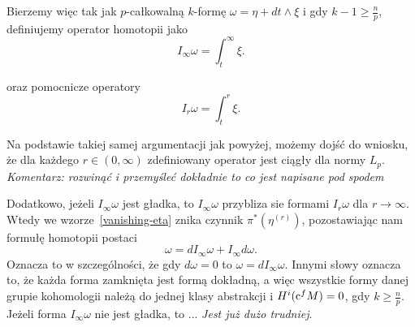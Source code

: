\documentclass[licencjacka]{pracamgr}
\theoremstyle{definition}
\theoremstyle{definition}
\theoremstyle{plain}
\theoremstyle{plain}
\theoremstyle{plain}
\theoremstyle{plain}
\def\cfm{\ensuremath\mathrm{c}^fM}
\begin{document}
Bierzemy więc tak jak $p$-całkowalną $k$-formę $\omega = \eta + dt \wedge \xi$
i gdy $k-1 \geq \frac{n}{p}$, definiujemy operator homotopii jako
\[
I_\infty \omega = \int_t^\infty \xi.
\]

oraz pomocnicze operatory
\[
I_r \omega = \int_t^r \xi.
\]

Na podstawie takiej samej argumentacji jak powyżej, możemy dojść do wniosku, że
dla każdego $r \in (0, \infty)$ zdefiniowany operator jest ciągły dla normy
$L_p$. \\

\emph{Komentarz: rozwinąć i przemyśleć dokładnie to co jest napisane pod spodem}

Dodatkowo, jeżeli 
$I_\infty\omega$ jest gładka, to $I_\infty\omega$ przybliza sie
formami $I_r\omega$ dla $r \rightarrow \infty$.
Wtedy we wzorze~\ref{vanishing-eta} znika czynnik
    $\pi^\ast \left( \eta^{(r)} \right)$, pozostawiając nam formułę homotopii
postaci
\[
\omega = dI_\infty \omega + I_\infty d \omega.
\]
Oznacza to w szczególności, że gdy $d \omega = 0$ to $\omega = d I_\infty
\omega$. Innymi słowy oznacza to, że każda forma zamknięta jest formą dokładną,
a więc wszystkie formy danej grupie kohomologii należą do jednej klasy
abstrakcji i $H^i(\cfm) = 0$, gdy $k \geq \frac{n}{p}$. \\

Jeżeli forma
$I_\infty\omega$ nie jest gładka, to ... \emph{Jest już dużo trudniej}.
\end{document}
